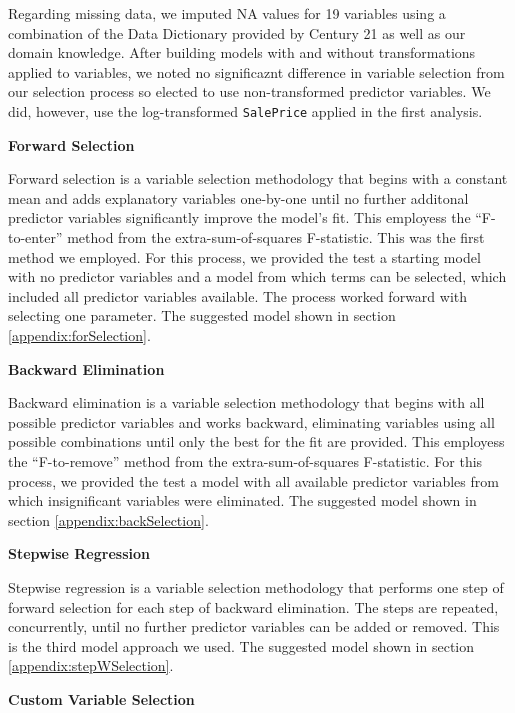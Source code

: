 \documentclass[american,]{article}
\begin{document}
Regarding missing data, we imputed NA values for 19 variables using a
combination of the Data Dictionary provided by Century 21 as well as our
domain knowledge. After building models with and without transformations
applied to variables, we noted no significaznt difference in variable
selection from our selection process so elected to use non-transformed
predictor variables. We did, however, use the log-transformed
\texttt{SalePrice} applied in the first analysis.

\textbf{Forward Selection}

Forward selection is a variable selection methodology that begins with a
constant mean and adds explanatory variables one-by-one until no further
additonal predictor variables significantly improve the model's fit.
This employess the ``F-to-enter'' method from the extra-sum-of-squares
F-statistic. This was the first method we employed. For this process, we
provided the test a starting model with no predictor variables and a
model from which terms can be selected, which included all predictor
variables available. The process worked forward with selecting one
parameter. The suggested model shown in section
\ref{appendix:forSelection}.

\textbf{Backward Elimination}

Backward elimination is a variable selection methodology that begins
with all possible predictor variables and works backward, eliminating
variables using all possible combinations until only the best for the
fit are provided. This employess the ``F-to-remove'' method from the
extra-sum-of-squares F-statistic. For this process, we provided the test
a model with all available predictor variables from which insignificant
variables were eliminated. The suggested model shown in section
\ref{appendix:backSelection}.

\textbf{Stepwise Regression}

Stepwise regression is a variable selection methodology that performs
one step of forward selection for each step of backward elimination. The
steps are repeated, concurrently, until no further predictor variables
can be added or removed. This is the third model approach we used. The
suggested model shown in section \ref{appendix:stepWSelection}.

\textbf{Custom Variable Selection}
\end{document}
